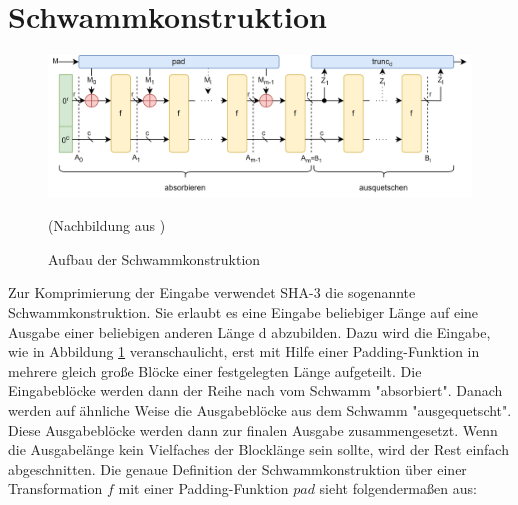 \section{Schwammkonstruktion}
\label{cha:schwammkonstruktion}
\begin{figure}
    \center
    \includegraphics[scale=0.175]{images/Schwammkonstruktion.png}
    \caption{Aufbau der Schwammkonstruktion}
	(Nachbildung aus \cite{sha3-standard})
    \label{fig:schwammkonstruktion}
\end{figure}
Zur Komprimierung der Eingabe verwendet SHA-3 die sogenannte Schwammkonstruktion.
Sie erlaubt es eine Eingabe beliebiger Länge auf eine Ausgabe einer beliebigen anderen Länge d abzubilden.
Dazu wird die Eingabe, wie in Abbildung \ref{fig:schwammkonstruktion} veranschaulicht, erst mit Hilfe einer
Padding-Funktion in mehrere gleich große Blöcke einer festgelegten Länge aufgeteilt. Die Eingabeblöcke werden
dann der Reihe nach vom Schwamm "absorbiert". Danach werden auf ähnliche Weise die Ausgabeblöcke aus dem Schwamm "ausgequetscht".
Diese Ausgabeblöcke werden dann zur finalen Ausgabe zusammengesetzt. Wenn die Ausgabelänge kein Vielfaches der Blocklänge sein sollte, wird der Rest einfach abgeschnitten.
Die genaue Definition der Schwammkonstruktion über einer Transformation $f$ mit einer Padding-Funktion $pad$ sieht folgendermaßen aus:

